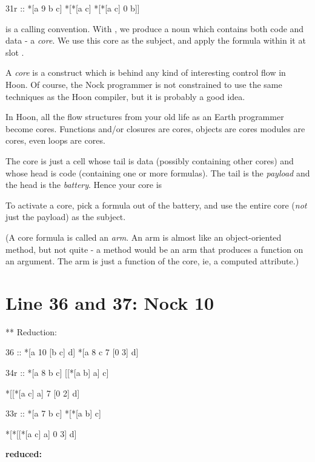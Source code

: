 \begin{code}
31r ::     *[a 9 b c]        *[*[a c] *[*[a c] 0 b]] 
\end{code}

 is a calling convention.  With , we produce a noun which contains both
code and data - a \emph{core}.  We use this core as the subject, and apply the
formula within it at slot .

A \emph{core} is a construct which is behind any kind of interesting control flow in
Hoon.  Of course, the Nock programmer is not constrained to use the same
techniques as the Hoon compiler, but it is probably a good idea. 

In Hoon, all the flow structures from your old life as an Earth programmer
become cores.  Functions and/or closures are cores, objects are cores modules
are cores, even loops are cores.

The core is just a cell whose tail is data (possibly containing other cores)
and whose head is code (containing one or more formulas).  The tail is the
\emph{payload} and the head is the \emph{battery}.  Hence your core is

\begin{code}
\end{code}
To activate a core, pick a formula out of the battery, and use the entire core
(\emph{not} just the payload) as the subject.  

(A core formula is called an \emph{arm}.  An arm is almost like an object-oriented
method, but not quite - a method would be an arm that produces a function on an
argument.  The arm is just a function of the core, ie, a computed attribute.)

\section{Line 36 and 37: Nock 10}

** Reduction:

\begin{code}
 36 :: *[a 10 [b c] d]   *[a 8 c 7 [0 3] d]

34r ::     *[a 8 b c]        [[*[a b] a] c]

*[[*[a c] a] 7 [0 2] d]

33r ::     *[a 7 b c]        *[*[a b] c]

*[*[[*[a c] a] 0 3] d]
\end{code}
\textbf{ reduced:}

